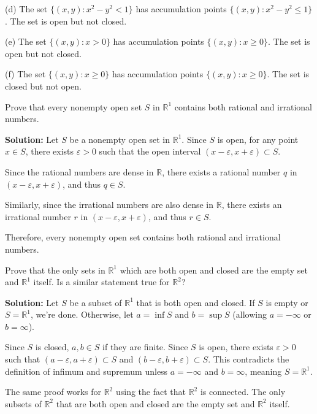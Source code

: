 (d) The set $\{(x,y) : x^2 - y^2 < 1\}$ has accumulation points $\{(x,y) : x^2 - y^2 \leq 1\}$. The set is open but not closed.

(e) The set $\{(x,y) : x > 0\}$ has accumulation points $\{(x,y) : x \geq 0\}$. The set is open but not closed.

(f) The set $\{(x,y) : x \geq 0\}$ has accumulation points $\{(x,y) : x \geq 0\}$. The set is closed but not open.

\begin{problembox}
Prove that every nonempty open set $S$ in $\mathbb{R}^1$ contains both rational and irrational numbers.
\end{problembox}

\textbf{Solution:} Let $S$ be a nonempty open set in $\mathbb{R}^1$. Since $S$ is open, for any point $x \in S$, there exists $\varepsilon > 0$ such that the open interval $(x-\varepsilon, x+\varepsilon) \subset S$.

Since the rational numbers are dense in $\mathbb{R}$, there exists a rational number $q$ in $(x-\varepsilon, x+\varepsilon)$, and thus $q \in S$.

Similarly, since the irrational numbers are also dense in $\mathbb{R}$, there exists an irrational number $r$ in $(x-\varepsilon, x+\varepsilon)$, and thus $r \in S$.

Therefore, every nonempty open set contains both rational and irrational numbers.

\begin{problembox}
Prove that the only sets in $\mathbb{R}^1$ which are both open and closed are the empty set and $\mathbb{R}^1$ itself. Is a similar statement true for $\mathbb{R}^2$?
\end{problembox}

\textbf{Solution:} Let $S$ be a subset of $\mathbb{R}^1$ that is both open and closed. If $S$ is empty or $S = \mathbb{R}^1$, we're done. Otherwise, let $a = \inf S$ and $b = \sup S$ (allowing $a = -\infty$ or $b = \infty$).

Since $S$ is closed, $a, b \in S$ if they are finite. Since $S$ is open, there exists $\varepsilon > 0$ such that $(a-\varepsilon, a+\varepsilon) \subset S$ and $(b-\varepsilon, b+\varepsilon) \subset S$. This contradicts the definition of infimum and supremum unless $a = -\infty$ and $b = \infty$, meaning $S = \mathbb{R}^1$.

The same proof works for $\mathbb{R}^2$ using the fact that $\mathbb{R}^2$ is connected. The only subsets of $\mathbb{R}^2$ that are both open and closed are the empty set and $\mathbb{R}^2$ itself.

